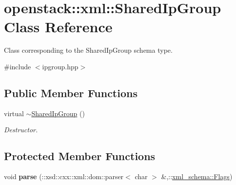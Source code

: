 \hypertarget{classopenstack_1_1xml_1_1SharedIpGroup}{
\section{openstack::xml::SharedIpGroup Class Reference}
\label{classopenstack_1_1xml_1_1SharedIpGroup}
}


Class corresponding to the SharedIpGroup schema type.  




{\ttfamily \#include $<$ipgroup.hpp$>$}

\subsection*{Public Member Functions}
\begin{DoxyCompactItemize}
\item 
\hypertarget{classopenstack_1_1xml_1_1SharedIpGroup_abd4a65f8cc5108a7e81f53f9f58ad709}{
virtual \hyperlink{classopenstack_1_1xml_1_1SharedIpGroup_abd4a65f8cc5108a7e81f53f9f58ad709}{$\sim$SharedIpGroup} ()}
\label{classopenstack_1_1xml_1_1SharedIpGroup_abd4a65f8cc5108a7e81f53f9f58ad709}

\begin{DoxyCompactList}\small\item\em Destructor. \item\end{DoxyCompactList}\end{DoxyCompactItemize}
\subsection*{Protected Member Functions}
\begin{DoxyCompactItemize}
\item 
\hypertarget{classopenstack_1_1xml_1_1SharedIpGroup_abcd408d99b5f8747108253fbb54b9cef}{
void {\bfseries parse} (::xsd::cxx::xml::dom::parser$<$ char $>$ \&,::\hyperlink{namespacexml__schema_affb4c227cbd9aa7453dd1dc5a1401943}{xml\_\-schema::Flags})}
\label{classopenstack_1_1xml_1_1SharedIpGroup_abcd408d99b5f8747108253fbb54b9cef}

\end{DoxyCompactItemize}
